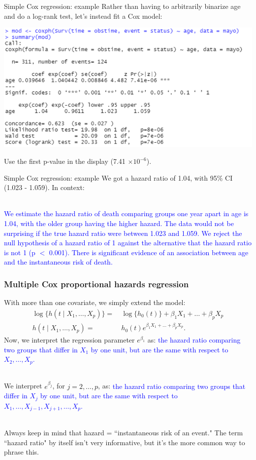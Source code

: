 \documentclass[10pt,t]{beamer}
\begin{document}
\begin{frame}{Simple Cox regression: example}
	Rather than having to arbitrarily binarize age and do a log-rank test, let's instead fit a Cox model: 
	\begin{center}
		\includegraphics[width = \textwidth]{figs/cox_age.png}
	\end{center}
	Use the first p-value in the display (7.41 $\times 10^{-6}$).
\end{frame}

\begin{frame}{Simple Cox regression: example}
	We got a hazard ratio of 1.04, with 95\% CI (1.023 - 1.059). In context:
	\\ ~\ 
	
	\textcolor{blue}{We estimate the hazard ratio of death comparing groups one year apart in age is 1.04, with the older group having the higher hazard. The data would not be surprising if the true hazard ratio were between 1.023 and 1.059. We reject the null hypothesis of a hazard ratio of 1 against the alternative that the hazard ratio is not 1 (p $<$ 0.001). There is significant evidence of an association between age and the instantaneous risk of death.}
\end{frame}

\begin{frame}
\frametitle{Multiple Cox proportional hazards regression}
With more than one covariate, we simply extend the model:
\begin{align*}
\log \{h(t \mid X_1, \dots, X_p)\} = & \ \log\{h_0(t)\} + \beta_1 X_1 + \dots + \beta_pX_p \\
h(t \mid X_1, \dots, X_p) = & \ h_0(t)e^{\beta_1X_1 + \dots + \beta_pX_p}.
\end{align*}
\pause 
Now, we interpret the regression parameter $e^{\beta_1}$ as: \pause \textcolor{blue}{the hazard ratio comparing two groups that differ in $X_1$ by one unit, but are the same with respect to $X_2, \dots, X_p$.} \pause 
\\ ~\ 

We interpret $e^{\beta_j}$, for $j = 2, \dots, p$, as: \pause
\textcolor{blue}{the hazard ratio comparing two groups that differ in $X_j$ by one unit, but are the same with respect to $X_1, \dots, X_{j-1}, X_{j+1}, \dots, X_p$.} \pause 
\\ ~\

Always keep in mind that hazard = ``instantaneous risk of an event." The term ``hazard ratio" by itself isn't very informative, but it's the more common way to phrase this.
\end{frame}
\end{document}
